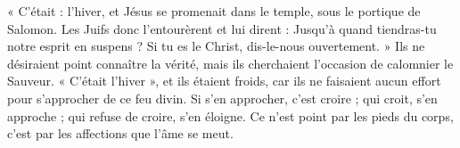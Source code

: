 « C’était : l’hiver, et Jésus se promenait dans le temple, sous le portique de Salomon. Les Juifs donc l’entourèrent et lui dirent : Jusqu’à quand tiendras-tu notre esprit en suspens ? Si tu es le Christ, dis-le-nous ouvertement. » Ils ne désiraient point connaître la vérité, mais ils cherchaient l’occasion de calomnier le Sauveur. « C’était l’hiver », et ils étaient froids, car ils ne faisaient aucun effort pour s’approcher de ce feu divin. Si s’en approcher, c’est croire ; qui croit, s’en approche ; qui refuse de croire, s’en éloigne. Ce n’est point par les pieds du corps, c’est par les affections que l’âme se meut.